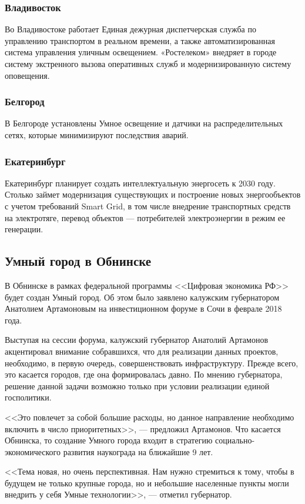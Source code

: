 \subsubsection{Владивосток}
Во Владивостоке работает Единая дежурная диспетчерская служба по управлению транспортом в реальном времени, а также автоматизированная система управления уличным освещением. «Ростелеком» внедряет в городе систему экстренного вызова оперативных служб и модернизированную систему оповещения.
\subsubsection{Белгород}
В Белгороде установлены Умное освещение и датчики на распределительных сетях, которые минимизируют последствия аварий.
\subsubsection{Екатеринбург}
Екатеринбург планирует создать интеллектуальную энергосеть к 2030 году. Столько займет модернизация существующих и построение новых энергообъектов с учетом требований Smart Grid, в том числе внедрение транспортных средств на электротяге, перевод объектов --- потребителей электроэнергии в режим ее генерации.

\subsection{Умный город в Обнинске}
В Обнинске в рамках федеральной программы <<Цифровая экономика РФ>> будет создан Умный город. Об этом было заявлено калужским губернатором Анатолием Артамоновым на инвестиционном форуме в Сочи в феврале 2018 года.\cite{smartcityObn}

Выступая на сессии форума, калужский губернатор Анатолий Артамонов акцентировал внимание собравшихся, что для реализации данных проектов, необходимо, в первую очередь, совершенствовать инфраструктуру. Прежде всего, это касается городов, где она формировалась давно. По мнению губернатора, решение данной задачи возможно только при условии реализации единой госполитики. 

<<Это повлечет за собой большие расходы, но данное направление необходимо включить в число приоритетных>>, --- предложил Артамонов. Что касается Обнинска, то создание Умного города входит в стратегию социально-экономического развития наукограда на ближайшие 9 лет. 

<<Тема новая, но очень перспективная. Нам нужно стремиться к тому, чтобы в будущем не только крупные города, но и небольшие населенные пункты могли внедрить у себя Умные технологии>>, --- отметил губернатор. 


